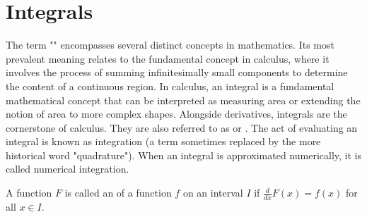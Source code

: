 \section{Integrals}

The term "" encompasses several distinct concepts in mathematics. Its most prevalent meaning relates to the fundamental concept in calculus, where it involves the process of summing infinitesimally small components to determine the content of a continuous region. In calculus, an integral is a fundamental mathematical concept that can be interpreted as measuring area or extending the notion of area to more complex shapes. Alongside derivatives, integrals are the cornerstone of calculus. They are also referred to as  or . The act of evaluating an integral is known as integration (a term sometimes replaced by the more historical word "quadrature"). When an integral is approximated numerically, it is called numerical integration.

\begin{defn}{1}
A function $F$ is called an  of a function $f$ on an interval $I$ if $\frac{d}{dx}F(x)=f(x)$ for all $x\in I$.
\end{defn}

